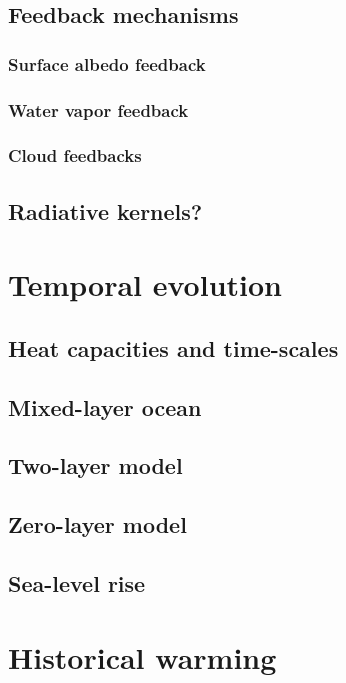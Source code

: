 \documentclass[12pt]{book}
\begin{document}
\section{Feedback mechanisms}
\subsection{Surface albedo feedback}
\subsection{Water vapor feedback}
\subsection{Cloud feedbacks}

\section{Radiative kernels?}

\chapter{Temporal evolution}
\section{Heat capacities and time-scales}
\section{Mixed-layer ocean}
\section{Two-layer model}
\section{Zero-layer model}
\section{Sea-level rise}

\chapter{Historical warming}
\end{document}
